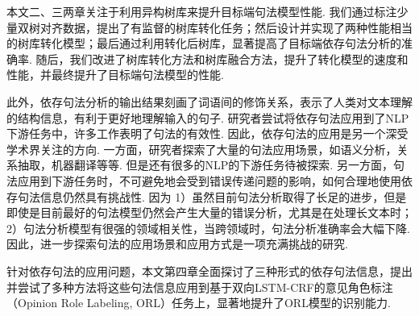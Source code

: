 本文二、三两章关注于利用异构树库来提升目标端句法模型性能. 我们通过标注少量双树对齐数据，提出了有监督的树库转化任务；然后设计并实现了两种性能相当的树库转化模型；最后通过利用转化后树库，显著提高了目标端依存句法分析的准确率. 随后，我们改进了树库转化方法和树库融合方法，提升了转化模型的速度和性能，并最终提升了目标端句法模型的性能.

此外，依存句法分析的输出结果刻画了词语间的修饰关系，表示了人类对文本理解的结构信息，有利于更好地理解输入的句子.
研究者尝试将依存句法应用到了NLP下游任务中，许多工作表明了句法的有效性.
因此，依存句法的应用是另一个深受学术界关注的方向.
一方面，研究者探索了大量的句法应用场景，如语义分析，关系抽取，机器翻译等等. 但是还有很多的NLP的下游任务待被探索.
另一方面，句法应用到下游任务时，不可避免地会受到错误传递问题的影响，如何合理地使用依存句法信息仍然具有挑战性.
因为 1）虽然目前句法分析取得了长足的进步，但是即使是目前最好的句法模型仍然会产生大量的错误分析，尤其是在处理长文本时；
2）句法分析模型有很强的领域相关性，当跨领域时，句法分析准确率会大幅下降.
因此，进一步探索句法的应用场景和应用方式是一项充满挑战的研究.

针对依存句法的应用问题，本文第四章全面探讨了三种形式的依存句法信息，提出并尝试了多种方法将这些句法信息应用到基于双向LSTM-CRF的意见角色标注（Opinion Role Labeling, ORL）任务上，显著地提升了ORL模型的识别能力.


